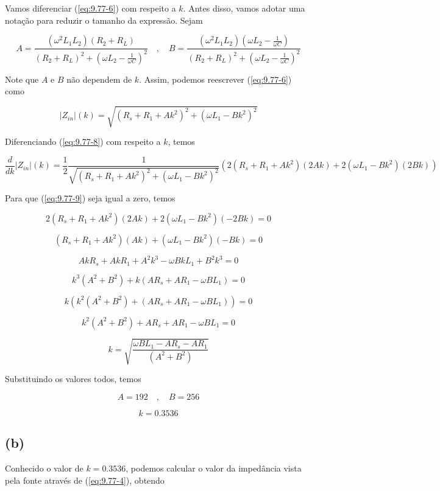 Vamos diferenciar (\ref{eq:9.77-6}) com respeito a \(k\). Antes disso, vamos adotar uma notação para reduzir o tamanho da expressão.
Sejam

\[ 
    A = \frac{(\omega^2L_1L_2)(R_2 + R_L)}{(R_2 + R_L)^2 + (\omega L_2 - \frac{1}{\omega C})^2} 
    \quad , \quad
    B = \frac{(\omega^2L_1L_2)(\omega L_2 - \frac{1}{\omega C})}{(R_2 + R_L)^2 + (\omega L_2 - \frac{1}{\omega C})^2}
\]

Note que  \(A\) e \(B\) não dependem de \(k\). Assim, podemos reescrever (\ref{eq:9.77-6}) como

\begin{equation}\label{eq:9.77-8}\tag{9.77-8}
    |Z_{in}|(k) = \sqrt{\left(R_s + R_1 + A k^2\right)^2 + \left(\omega L_1 - B k^2\right)^2}
\end{equation}

Diferenciando (\ref{eq:9.77-8}) com respeito a \(k\), temos

\begin{equation}\label{eq:9.77-9}\tag{9.77-9}
    \frac{d}{dk}|Z_{in}|(k) = \frac{1}{2}\frac{1}{\sqrt{\left(R_s + R_1 + A k^2\right)^2 + \left(\omega L_1 - B k^2\right)^2}} \left(2(R_s + R_1 + A k^2)(2Ak) + 2(\omega L_1 - B k^2)(2Bk)\right)
\end{equation}

Para que (\ref{eq:9.77-9}) seja igual a zero, temos

\[ 2(R_s + R_1 + A k^2)(2Ak) + 2(\omega L_1 - B k^2)(-2Bk) = 0 \]

\[ (R_s + R_1 + A k^2)(Ak) + (\omega L_1 - B k^2)(-Bk) = 0 \]

\[ AkR_s + AkR_1 + A^2k^3 - \omega BkL_1 + B^2k^3 = 0 \]

\[ k^3(A^2+B^2) + k(AR_s + AR_1 - \omega BL_1) = 0 \]

\[ k\left(k^2(A^2+B^2) + (AR_s + AR_1 - \omega BL_1)\right) = 0 \]

\[ k^2(A^2+B^2) + AR_s + AR_1 - \omega BL_1 = 0 \]

\[ k = \sqrt{\frac{\omega BL_1 - AR_s - AR_1 }{(A^2+B^2)}} \]

Substituindo os valores todos, temos

\[ A = 192 \quad , \quad B = 256 \]

\[ \boxed{k = 0.3536} \]

\subsection*{(b)}

Conhecido o valor de \(k = 0.3536\), podemos calcular o valor da impedância vista pela fonte através de (\ref{eq:9.77-4}), obtendo

